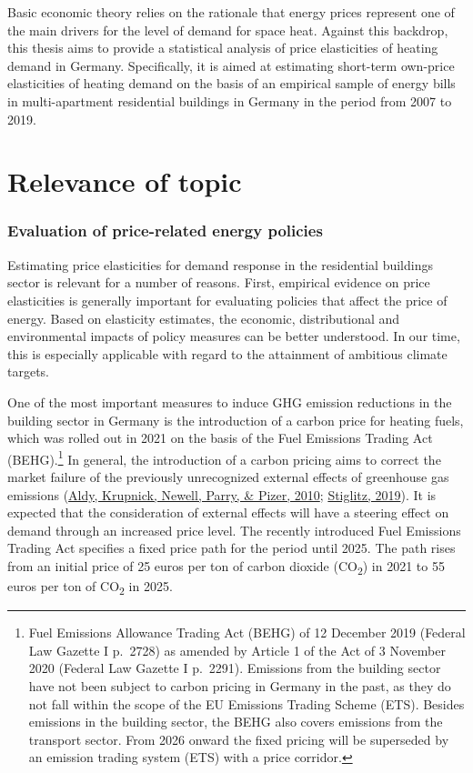 \documentclass[12pt,twoside]{reedthesis}
\begin{document}
Basic economic theory relies on the rationale that energy prices represent one of the main drivers for the level of demand for space heat. Against this backdrop, this thesis aims to provide a statistical analysis of price elasticities of heating demand in Germany. Specifically, it is aimed at estimating short-term own-price elasticities of heating demand on the basis of an empirical sample of energy bills in multi-apartment residential buildings in Germany in the period from 2007 to 2019.

\hypertarget{relevance}{%
\section{Relevance of topic}\label{relevance}}

\hypertarget{evaluation-of-price-related-energy-policies}{%
\subsubsection*{Evaluation of price-related energy policies}\label{evaluation-of-price-related-energy-policies}}

Estimating price elasticities for demand response in the residential buildings sector is relevant for a number of reasons. First, empirical evidence on price elasticities is generally important for evaluating policies that affect the price of energy. Based on elasticity estimates, the economic, distributional and environmental impacts of policy measures can be better understood. In our time, this is especially applicable with regard to the attainment of ambitious climate targets.

One of the most important measures to induce GHG emission reductions in the building sector in Germany is the introduction of a carbon price for heating fuels, which was rolled out in 2021 on the basis of the Fuel Emissions Trading Act (BEHG).\footnote{Fuel Emissions Allowance Trading Act (BEHG) of 12 December 2019 (Federal Law Gazette I p.~2728) as amended by Article 1 of the Act of 3 November 2020 (Federal Law Gazette I p.~2291). Emissions from the building sector have not been subject to carbon pricing in Germany in the past, as they do not fall within the scope of the EU Emissions Trading Scheme (ETS). Besides emissions in the building sector, the BEHG also covers emissions from the transport sector. From 2026 onward the fixed pricing will be superseded by an emission trading system (ETS) with a price corridor.} In general, the introduction of a carbon pricing aims to correct the market failure of the previously unrecognized external effects of greenhouse gas emissions (\protect\hyperlink{ref-aldy_etal10}{Aldy, Krupnick, Newell, Parry, \& Pizer, 2010}; \protect\hyperlink{ref-stiglitz19}{Stiglitz, 2019}). It is expected that the consideration of external effects will have a steering effect on demand through an increased price level. The recently introduced Fuel Emissions Trading Act specifies a fixed price path for the period until 2025. The path rises from an initial price of 25 euros per ton of carbon dioxide (CO\textsubscript{2}) in 2021 to 55 euros per ton of CO\textsubscript{2} in 2025.
\end{document}
